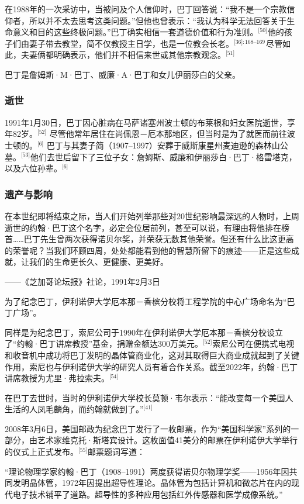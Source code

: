 在1988年的一次采访中，当被问及个人信仰时，巴丁回答说：“我不是一个宗教信仰者，所以并不太去思考这类问题。”但他也曾表示：“我认为科学无法回答关于生命意义和目的这些终极问题。”巴丁确实相信一套道德价值和行为准则。\(^\text{[50]}\)他的孩子们由妻子带去教堂，简不仅教授主日学，也是一位教会长老。\(^\text{[36]: 168–169 }\)尽管如此，夫妻俩都明确表示，他们并不相信来世或其他宗教观念。\(^\text{[51]}\)

巴丁是詹姆斯·M·巴丁、威廉·A·巴丁和女儿伊丽莎白的父亲。
\subsubsection{逝世}
1991年1月30日，巴丁因心脏病在马萨诸塞州波士顿的布莱根和妇女医院逝世，享年82岁。\(^\text{[52]}\) 尽管他常年居住在尚佩恩－厄本那地区，但当时是为了就医而前往波士顿的。\(^\text{[6]}\) 巴丁与其妻子简（1907–1997）安葬于威斯康星州麦迪逊的森林山公墓。\(^\text{[53]}\)他们去世后留下了三位子女：詹姆斯、威廉和伊丽莎白·巴丁·格雷塔克，以及六位孙辈。\(^\text{[6]}\)
\subsubsection{遗产与影响}
在本世纪即将结束之际，当人们开始列举那些对20世纪影响最深远的人物时，上周逝世的约翰·巴丁这个名字，必定会位居前列，甚至可以说，有理由将他排在榜首……巴丁先生曾两次获得诺贝尔奖，并荣获无数其他荣誉。但还有什么比这更高的荣誉呢？当我们环顾四周，处处都能看到他的智慧所留下的痕迹——正是这些成就，让我们的生命更长久、更健康、更美好。

——《芝加哥论坛报》社论，1991年2月3日

为了纪念巴丁，伊利诺伊大学厄本那－香槟分校将工程学院的中心广场命名为“巴丁广场”。

同样是为纪念巴丁，索尼公司于1990年在伊利诺伊大学厄本那－香槟分校设立了“约翰·巴丁讲席教授”基金，捐赠金额达300万美元。\(^\text{[52]}\)索尼公司在便携式电视和收音机中成功将巴丁发明的晶体管商业化，这对其取得巨大商业成就起到了关键作用，索尼也与伊利诺伊大学的研究人员有着合作关系。截至2022年，约翰·巴丁讲席教授为尤里·弗拉索夫。\(^\text{[54]}\)

在巴丁去世时，当时的伊利诺伊大学校长莫顿·韦尔表示：“能改变每一个美国人生活的人凤毛麟角，而约翰就做到了。”\(^\text{[41]}\)

2008年3月6日，美国邮政为纪念巴丁发行了一枚邮票，作为“美国科学家”系列的一部分，由艺术家维克托·斯塔宾设计。这枚面值41美分的邮票在伊利诺伊大学举行的仪式上正式发布。\(^\text{[55]}\)邮票题词写道：

“理论物理学家约翰·巴丁（1908–1991）两度获得诺贝尔物理学奖——1956年因共同发明晶体管，1972年因提出超导性理论。晶体管为包括计算机和微芯片在内的现代电子技术铺平了道路。超导性的多种应用包括红外传感器和医学成像系统。”

